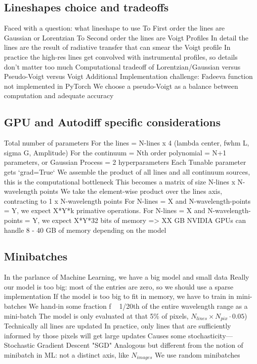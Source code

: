 \documentclass[modern]{aastex631}
\begin{document}
\subsection{Lineshapes choice and tradeoffs}
\begin{outline}
  \1 Faced with a question: what lineshape to use
  \2 To First order the lines are Gaussian or Lorentzian
  \2 To Second order the lines are Voigt Profiles
  \2 In detail the lines are the result of radiative transfer that can smear the Voigt profile
  \2 In practice the high-res lines get convolved with instrumental profiles, so details don't matter too much
  \1 Computational tradeoff of Lorentzian/Gaussian versus Pseudo-Voigt versus Voigt
  \2 Additional Implementation challenge: Fadeeva function not implemented in PyTorch
  \1 We choose a pseudo-Voigt as a balance between computation and adequate accuracy
\end{outline}

\subsection{GPU and Autodiff specific considerations}
\begin{outline}
  \1 Total number of parameters
  \2 For the lines =  N-lines x 4 (lambda center, fwhm L, sigma G, Amplitude)
  \2 For the continuum = Nth order polynomial = N+1 parameters, or Gaussian Process = 2 hyperparameters
  \1 Each Tunable parameter gets `grad=True`
  \1 We assemble the product of all lines and all continuum sources, this is the computational bottleneck
  \1 This becomes a matrix of size N-lines x N-wavelength points
  \1 We take the element-wise product over the lines axis, contracting to 1 x N-wavelength points
  \1 For N-lines = X and N-wavelength-points = Y, we expect X*Y*k primative operations.
  \1 For N-lines = X and N-wavelength-points = Y, we expect X*Y*32 bits of memory => XX GB
  \1 NVIDIA GPUs can handle 8 - 40 GB of memory depending on the model
\end{outline}

\subsection{Minibatches}
\begin{outline}
  \1 In the parlance of Machine Learning, we have a big model and small data
  \1 Really our model is too big: most of the entries are zero, so we should use a sparse implementation
  \1 If the model is too big to fit in memory, we have to train in mini-batches
  \1 We hand-in some fraction f ~ 1/20th of the entire wavelength range as a mini-batch
  \1 The model is only evaluated at that 5\% of pixels,  $N_{lines} \times N_{pix} \cdot 0.05$)
  \1 Technically all lines are updated
  \1 In practice, only lines that are sufficiently informed by those pixels will get large updates
  \1 Causes some stochasticity--- Stochastic Gradient Descent "SGD"
  \1 Analogous but different from the notion of minibatch in ML: not a distinct axis, like $N_{images}$
  \1 We use random minibatches
\end{outline}
\end{document}

